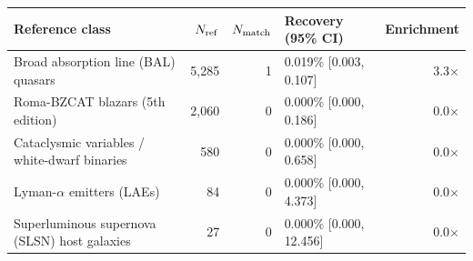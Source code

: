 \begin{ruledtabular}
\begin{tabular}{l r r l r}
Reference class & $N_{\rm ref}$ & $N_{\rm match}$ & Recovery (95\% CI) & Enrichment \\
\hline
Broad absorption line (BAL) quasars & 5{,}285 & 1 & 0.019\% [0.003, 0.107] & 3.3$\times$ \\
Roma-BZCAT blazars (5th edition) & 2{,}060 & 0 & 0.000\% [0.000, 0.186] & 0.0$\times$ \\
Cataclysmic variables / white-dwarf binaries & 580 & 0 & 0.000\% [0.000, 0.658] & 0.0$\times$ \\
Lyman-$\alpha$ emitters (LAEs) & 84 & 0 & 0.000\% [0.000, 4.373] & 0.0$\times$ \\
Superluminous supernova (SLSN) host galaxies & 27 & 0 & 0.000\% [0.000, 12.456] & 0.0$\times$ \\
\end{tabular}
\end{ruledtabular}
